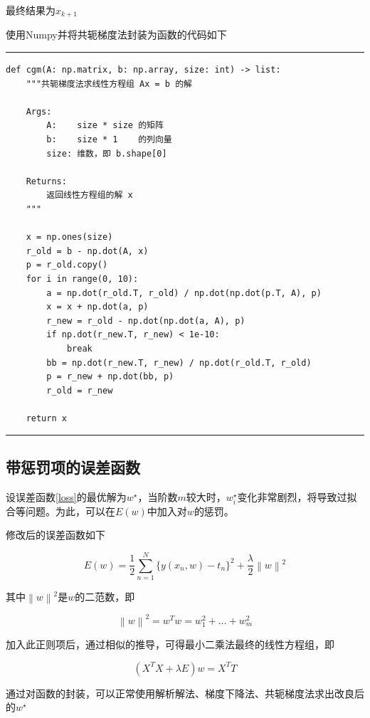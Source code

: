 最终结果为$x_{k + 1}$

使用Numpy并将共轭梯度法封装为函数的代码如下

\rule{\textwidth}{0.01em}
\begin{verbatim}
def cgm(A: np.matrix, b: np.array, size: int) -> list:
    """共轭梯度法求线性方程组 Ax = b 的解

    Args:
        A:    size * size 的矩阵
        b:    size * 1    的列向量
        size: 维数，即 b.shape[0]

    Returns:
        返回线性方程组的解 x
    """

    x = np.ones(size)
    r_old = b - np.dot(A, x)
    p = r_old.copy()
    for i in range(0, 10):
        a = np.dot(r_old.T, r_old) / np.dot(np.dot(p.T, A), p)
        x = x + np.dot(a, p)
        r_new = r_old - np.dot(np.dot(a, A), p)
        if np.dot(r_new.T, r_new) < 1e-10:
            break
        bb = np.dot(r_new.T, r_new) / np.dot(r_old.T, r_old)
        p = r_new + np.dot(bb, p)
        r_old = r_new

    return x
\end{verbatim}
\rule{\textwidth}{0.01em}

\subsection{带惩罚项的误差函数}

设误差函数\eqref{loss}的最优解为$w^{\star}$，当阶数$m$较大时，$w_i^{\star}$变化非常剧烈，将导致过拟合等问题。为此，可以在$E(w)$中加入对$w$的惩罚。

修改后的误差函数如下

\begin{equation}
    E(w) = \frac{1}{2} \sum_{n=1}^{N} \{ y(x_n, w) - t_n \}^2 + \frac{\lambda}{2} \left\lVert w \right\rVert ^2
\end{equation}

其中$\left\lVert w \right\rVert ^2$是$w$的二范数，即

\begin{equation}
    \left\lVert w \right\rVert ^2 = w^T w = w_1^2 + \ldots + w_m^2
\end{equation}

加入此正则项后，通过相似的推导，可得最小二乘法最终的线性方程组，即

\begin{equation}
    \left( X^T X + \lambda E \right) w = X^T T    
\end{equation}

通过对函数的封装，可以正常使用解析解法、梯度下降法、共轭梯度法求出改良后的$w^{\star}$
